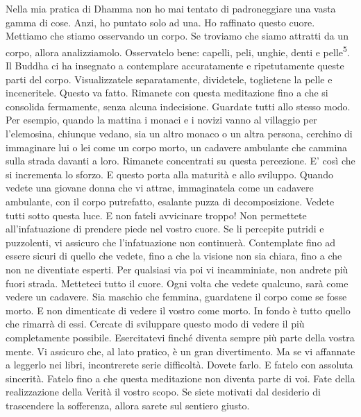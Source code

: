 Nella mia pratica di Dhamma non ho mai tentato di padroneggiare una
vasta gamma di cose. Anzi, ho puntato solo ad una. Ho raffinato questo
cuore. Mettiamo che stiamo osservando un corpo. Se troviamo che siamo
attratti da un corpo, allora analizziamolo. Osservatelo bene: capelli,
peli, unghie, denti e pelle\textsuperscript{5}. Il Buddha ci ha
insegnato a contemplare accuratamente e ripetutamente queste parti del
corpo. Visualizzatele separatamente, dividetele, toglietene la pelle e
inceneritele. Questo va fatto. Rimanete con questa meditazione fino a
che si consolida fermamente, senza alcuna indecisione. Guardate tutti
allo stesso modo. Per esempio, quando la mattina i monaci e i novizi
vanno al villaggio per l'elemosina, chiunque vedano, sia un altro monaco
o un altra persona, cerchino di immaginare lui o lei come un corpo
morto, un cadavere ambulante che cammina sulla strada davanti a loro.
Rimanete concentrati su questa percezione. E' così che si incrementa lo
sforzo. E questo porta alla maturità e allo sviluppo. Quando vedete una
giovane donna che vi attrae, immaginatela come un cadavere ambulante,
con il corpo putrefatto, esalante puzza di decomposizione. Vedete tutti
sotto questa luce. E non fateli avvicinare troppo! Non permettete
all'infatuazione di prendere piede nel vostro cuore. Se li percepite
putridi e puzzolenti, vi assicuro che l'infatuazione non continuerà.
Contemplate fino ad essere sicuri di quello che vedete, fino a che la
visione non sia chiara, fino a che non ne diventiate esperti. Per
qualsiasi via poi vi incamminiate, non andrete più fuori strada.
Metteteci tutto il cuore. Ogni volta che vedete qualcuno, sarà come
vedere un cadavere. Sia maschio che femmina, guardatene il corpo come se
fosse morto. E non dimenticate di vedere il vostro come morto. In fondo
è tutto quello che rimarrà di essi. Cercate di sviluppare questo modo di
vedere il più completamente possibile. Esercitatevi finché diventa
sempre più parte della vostra mente. Vi assicuro che, al lato pratico, è
un gran divertimento. Ma se vi affannate a leggerlo nei libri,
incontrerete serie difficoltà. Dovete farlo. E fatelo con assoluta
sincerità. Fatelo fino a che questa meditazione non diventa parte di
voi. Fate della realizzazione della Verità il vostro scopo. Se siete
motivati dal desiderio di trascendere la sofferenza, allora sarete sul
sentiero giusto.

